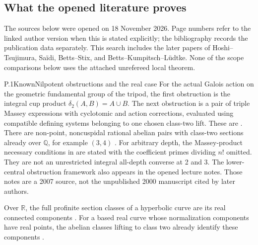 \subsection{What the opened literature proves}

The sources below were opened on 18 November 2026. Page numbers refer to the
linked author version when this is stated explicitly; the bibliography records
the publication data separately. This search includes the later papers of
Hoshi--Tsujimura, Sa\"idi, Betts--Stix, and Betts--Kumpitsch--L\"udtke.
None of the scope comparisons below uses the attached unrefereed local theorem.

\begin{result}{P.1}{Known}{Nilpotent obstructions and the real case}
For the actual Galois action on the geometric fundamental group of the tripod,
the first obstruction is the integral cup product
\(\delta_2(A,B)=A\cup B\). The next obstruction is a pair of triple
Massey expressions with cyclotomic and action corrections, evaluated using
compatible defining systems belonging to one chosen class-two lift.
These are \citet[\S12.3.1, Proposition 7, author p.~14;
Theorem 19 and Remark 20(ii), author pp.~21--22]{CohWickelgren2012}.
There are non-point, noncuspidal rational abelian pairs with class-two
sections already over \(\mathbb Q\), for example \((3,4)\)
\citep[Propositions 24--25, author pp.~26--27]{CohWickelgren2012}.
For arbitrary depth, the Massey-product necessary conditions in
\citet[\S3.11 and Corollary 3.12, arXiv author pp.~16--17]{LitWickelgrenN2012}
are stated with the coefficient primes dividing \(n!\) omitted.
They are not an unrestricted integral all-depth converse at 2 and 3.
The lower-central obstruction framework also appears in the opened
\citet[pp.~1--2]{LitEllenberg2007} lecture notes. Those notes are a
2007 source, not the unpublished 2000 manuscript cited by later authors.

Over \(\mathbb R\), the full profinite section classes of a hyperbolic
curve are its real connected components
\citep[Corollary 3.13, pp.~142--143]{LitMochizuki2003}.
For a based real curve whose normalization components have real points,
the abelian classes lifting to class two already identify these components
\citep[Theorem 1.1, author p.~2]{LitWickelgrenReal2014}.
\end{result}
